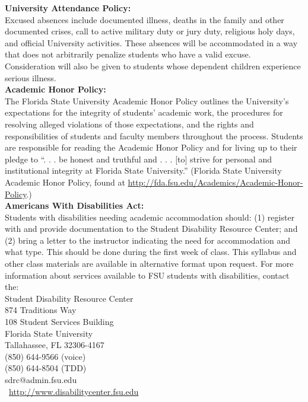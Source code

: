 \documentclass[11pt]{article}
\begin{document}
\textbf{\large University Attendance Policy:}\\
Excused absences include documented illness, deaths in the family and other documented crises, call to active
military duty or jury duty, religious holy days, and official University activities. These absences will be
accommodated in a way that does not arbitrarily penalize students who have a valid excuse. Consideration will
also be given to students whose dependent children experience serious illness.\\


\textbf{\large Academic Honor Policy:}\\
The Florida State University Academic Honor Policy outlines the University's expectations for the integrity of
students’ academic work, the procedures for resolving alleged violations of those expectations, and the rights
and responsibilities of students and faculty members throughout the process. Students are responsible for
reading the Academic Honor Policy and for living up to their pledge to “. . . be honest and truthful and . . . [to]
strive for personal and institutional integrity at Florida State University.” (Florida State University Academic
Honor Policy, found at \url{http://fda.fsu.edu/Academics/Academic-Honor-Policy}.)\\


\textbf{\large Americans With Disabilities Act:}\\
Students with disabilities needing academic accommodation should: (1) register with and provide
documentation to the Student Disability Resource Center; and (2) bring a letter to the instructor indicating the
need for accommodation and what type. This should be done during the first week of class.
This syllabus and other class materials are available in alternative format upon request.
For more information about services available to FSU students with disabilities, contact the:\\
Student Disability Resource Center\\
874 Traditions Way\\
108 Student Services Building\\
Florida State University\\
Tallahassee, FL 32306-4167\\
(850) 644-9566 (voice)\\
(850) 644-8504 (TDD)\\
sdrc@admin.fsu.edu\\\
\url{http://www.disabilitycenter.fsu.edu}\\
\end{document}
